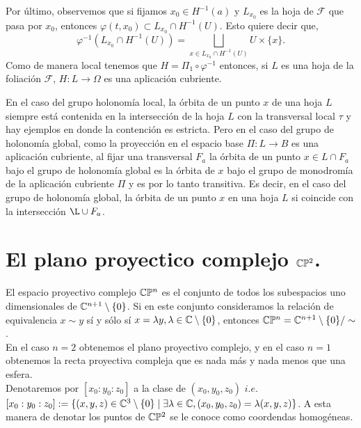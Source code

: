 \noindent Por último, observemos que si fijamos $x_{0}\in H^{-1}(a)$ y $L_{x_{0}}$ es la hoja de $\mathcal{F}$ que pasa por $x_{0}$, entonces $\varphi(t,x_{0})\subset L_{x_{0}}\cap H^{-1}(U)$. Esto quiere decir que,
$$\varphi^{-1}(L_{x_{0}}\cap H^{-1}(U))=\bigsqcup_{x\in L_{x_{0}}\cap H^{-1}(U)}U\times \{x\}.$$ Como de manera local tenemos que $H=\Pi_{1}\circ \varphi^{-1}$ entonces, si $L$ es una hoja de la foliación $\mathcal{F}$, $H\colon L\rightarrow \Omega$ es una aplicación cubriente.

\begin{Obs}
\label{Obs:Interseccion}
En el caso del grupo holonomía local, la órbita de un punto $x$ de una hoja $L$ siempre está contenida en la intersección de la hoja $L$ con la transversal local $\tau$ y hay ejemplos en donde la contención es estricta. Pero en el caso del grupo de holonomía global, como la proyección en el espacio base $\Pi\colon L\rightarrow B$ es una aplicación cubriente, al fijar una transversal $F_{a}$ la órbita de un punto $x\in L\cap F_{a}$ bajo el grupo de holonomía global es la órbita de $x$ bajo el grupo de monodromía de la aplicación cubriente $\Pi$ y es por lo tanto transitiva. Es decir, en el caso del grupo de holonomía global, la órbita de un punto $x$ en una hoja $L$ si coincide con la intersección $\L\cup F_{a}$.  
\end{Obs}

\section{El plano proyectico complejo $\mathbb{C}\mathbb{P}^{2}$.}

El espacio proyectivo complejo $\mathbb{C}\mathbb{P}^{n}$ es el conjunto de todos los subespacios uno dimensionales de $\mathbb{C}^{n+1}\setminus\{0\}$. Si en este conjunto consideramos la relación de equivalencia $x\sim y$ sí y sólo sí $x=\lambda y, \lambda\in\mathbb{C}\setminus\{0\}$, entonces $\mathbb{C}\mathbb{P}^{n} = \mathbb{C}^{n+1}\setminus\{0\} / \sim$.\\

En el caso $n=2$ obtenemos el plano proyectivo complejo, y en el caso $n=1$ obtenemos la recta proyectiva compleja que es nada más y nada menos que una esfera.\\

Denotaremos por $[x_{0}:y_{0}:z_{0}]$ a la clase de $(x_{0},y_{0},z_{0})$ $\mathit{i.e.}$ $[x_{0}:y_{0}:z_{0}]:=\{(x,y,z)\in\mathbb{C}^{3}\setminus\{0\} \mid \exists\lambda\in\mathbb{C},(x_{0},y_{0},z_{0})=\lambda (x,y,z)\}$. A esta manera de denotar los puntos de $\mathbb{C}\mathbb{P}^2$ se le conoce como coordendas homogéneas.\\

